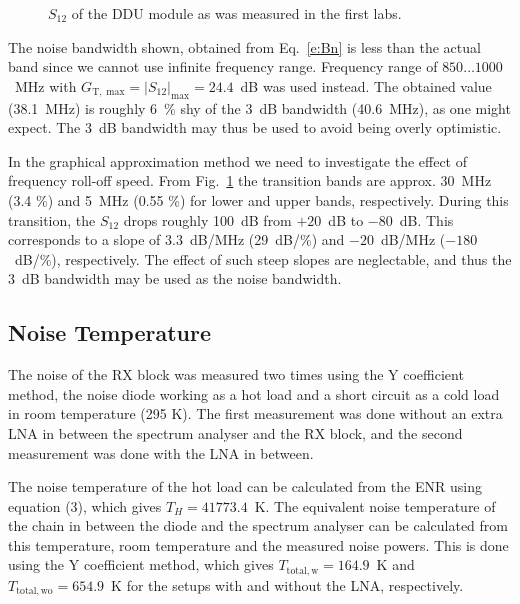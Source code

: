 \documentclass[a4paper, 12pt]{article}
\begin{document}
\begin{figure}[h!]
	\begin{center}
	\caption{$S_{12}$ of the DDU module as was measured in the first labs.}
	\label{f:s12}
	\end{center}
	\vspace*{-12pt}
\end{figure}

The noise bandwidth shown, obtained from Eq.~\ref{e:Bn} is less than the actual band since 
we cannot use infinite frequency range. Frequency range of $850 \ldots 1000$~MHz with
$G_\mathrm{T,\;max} = |S_{12}|_\mathrm{max} = 24.4$~dB was used instead. The obtained 
value (38.1~MHz) is roughly 6~\% shy of the 3~dB bandwidth (40.6~MHz), as one might expect.
The 3~dB bandwidth may thus be used to avoid being overly optimistic.

In the graphical approximation method we need to investigate the effect of frequency 
roll-off speed. From Fig.~\ref{f:s12} the transition bands are approx. 30~MHz (3.4 \%) 
and 5~MHz (0.55 \%) for lower and upper bands, respectively. During this transition, 
the $S_12$ drops roughly 100~dB from $+20$~dB to $-80$~dB. This corresponds to a slope 
of $3.3$~dB/MHz (29~dB/\%) and $-20$~dB/MHz ($-180$~dB/\%), respectively. The effect of 
such steep slopes are neglectable, and thus the 3~dB bandwidth may be used as the noise 
bandwidth.


\subsection{Noise Temperature}

\noindent
The noise of the RX block was measured two times using the Y coefficient method, the noise diode
working as a hot load and a short circuit as a cold load in room temperature (295 K). The first measurement was done without an extra LNA in between the spectrum analyser and the RX block, and the second measurement was done with the LNA in between.

The noise temperature of the hot load can be calculated from the ENR using equation (3), which gives $T_H = 41773.4$~K. The equivalent noise temperature of the chain in between the diode and the spectrum analyser can be calculated from this temperature, room temperature and the measured noise powers. This is done using the Y coefficient method, which gives $T_{\mathrm{total, w}} = 164.9$~K and $T_{\mathrm{total, wo}} = 654.9$~K for the setups with and without the LNA, respectively.
\end{document}
